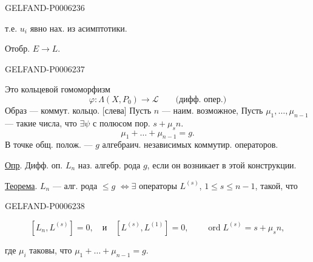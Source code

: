 \begin{GelfandAdjacentEvidence}{GELFAND-P000623}{6}

т.е. \(u_i\) явно нах. из асимптотики.

Отобр. \(E\longrightarrow L\).
\end{GelfandAdjacentEvidence}
\begin{GelfandAdjacentEvidence}{GELFAND-P000623}{7}

Это кольцевой гомоморфизм
\[
\varphi:\Lambda(X,P_0)\longrightarrow\mathcal L\qquad\text{(дифф. опер.)}
\]
Образ — коммут. кольцо.
[слева] Пусть \(n\) — наим. возможное,
Пусть \(\mu_1,\ldots,\mu_{n-1}\) — такие числа, что
\(\exists\psi\) с полюсом пор. \(s+\mu_s n\).
\[
\mu_1+\ldots+\mu_{n-1}=g.
\]
В точке общ. полож. — \(g\) алгебраич. независимых коммутир. операторов.

\underline{Опр}. Дифф. оп. \(L_n\) наз. алгебр. рода \(g\), если он возникает в этой конструкции.

\underline{Теорема}. \(L_n\) — алг. рода \(\le g\)
\(\Longleftrightarrow\exists\) операторы \(L^{(s)}\), \(1\le s\le n-1\), такой, что
\end{GelfandAdjacentEvidence}
\begin{GelfandAdjacentEvidence}{GELFAND-P000623}{8}

\[
[L_n,L^{(s)}]=0,\quad\text{и}\quad [L^{(s)},L^{(1)}]=0,\qquad
\operatorname{ord} L^{(s)}=s+\mu_s n,
\]
\end{GelfandAdjacentEvidence}

где \(\mu_i\) таковы, что \(\mu_1+\ldots+\mu_{n-1}=g\).


